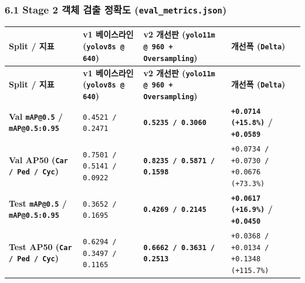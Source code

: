 \documentclass[10.5pt,a4paper]{article}
\begin{document}
\subsubsection{6.1 Stage 2 객체 검출 정확도 (\texttt{eval\_\allowbreak{}metrics.\allowbreak{}json})}

\begin{footnotesize}
\setlength{\tabcolsep}{4pt}
\setlength{\LTleft}{0pt}\setlength{\LTright}{0pt}
\begin{longtable}{>{\raggedright\arraybackslash}p{} >{\raggedright\arraybackslash}p{} >{\raggedright\arraybackslash}p{} >{\raggedright\arraybackslash}p{}}
\toprule
\textbf{Split / 지표} & \textbf{v1 베이스라인 (\texttt{yolov8s @ 640})} & \textbf{v2 개선판 (\texttt{yolo11m @ 960 + Oversampling})} & \textbf{개선폭 (\texttt{Delta})} \\
\midrule
\endfirsthead
\toprule
\textbf{Split / 지표} & \textbf{v1 베이스라인 (\texttt{yolov8s @ 640})} & \textbf{v2 개선판 (\texttt{yolo11m @ 960 + Oversampling})} & \textbf{개선폭 (\texttt{Delta})} \\
\midrule
\endhead
\bottomrule
\endfoot
\textbf{Val \texttt{mAP@0.\allowbreak{}5} / \texttt{mAP@0.\allowbreak{}5:\allowbreak{}0.\allowbreak{}95}} & \texttt{0.\allowbreak{}4521 /\allowbreak{} 0.\allowbreak{}2471} & \textbf{\texttt{0.\allowbreak{}5235 /\allowbreak{} 0.\allowbreak{}3060}} & \textbf{\texttt{+0.\allowbreak{}0714 (+15.\allowbreak{}8\%)} / \texttt{+0.\allowbreak{}0589}} \\
\textbf{Val AP50 (\texttt{Car /\allowbreak{} Ped /\allowbreak{} Cyc})} & \texttt{0.\allowbreak{}7501 /\allowbreak{} 0.\allowbreak{}5141 /\allowbreak{} 0.\allowbreak{}0922} & \textbf{\texttt{0.\allowbreak{}8235 /\allowbreak{} 0.\allowbreak{}5871 /\allowbreak{} 0.\allowbreak{}1598}} & \texttt{+0.\allowbreak{}0734 /\allowbreak{} +0.\allowbreak{}0730 /\allowbreak{} +0.\allowbreak{}0676 (+73.\allowbreak{}3\%)} \\
\textbf{Test \texttt{mAP@0.\allowbreak{}5} / \texttt{mAP@0.\allowbreak{}5:\allowbreak{}0.\allowbreak{}95}} & \texttt{0.\allowbreak{}3652 /\allowbreak{} 0.\allowbreak{}1695} & \textbf{\texttt{0.\allowbreak{}4269 /\allowbreak{} 0.\allowbreak{}2145}} & \textbf{\texttt{+0.\allowbreak{}0617 (+16.\allowbreak{}9\%)} / \texttt{+0.\allowbreak{}0450}} \\
\textbf{Test AP50 (\texttt{Car /\allowbreak{} Ped /\allowbreak{} Cyc})} & \texttt{0.\allowbreak{}6294 /\allowbreak{} 0.\allowbreak{}3497 /\allowbreak{} 0.\allowbreak{}1165} & \textbf{\texttt{0.\allowbreak{}6662 /\allowbreak{} 0.\allowbreak{}3631 /\allowbreak{} 0.\allowbreak{}2513}} & \texttt{+0.\allowbreak{}0368 /\allowbreak{} +0.\allowbreak{}0134 /\allowbreak{} +0.\allowbreak{}1348 (+115.\allowbreak{}7\%)} \\
\end{longtable}
\end{footnotesize}
\end{document}
